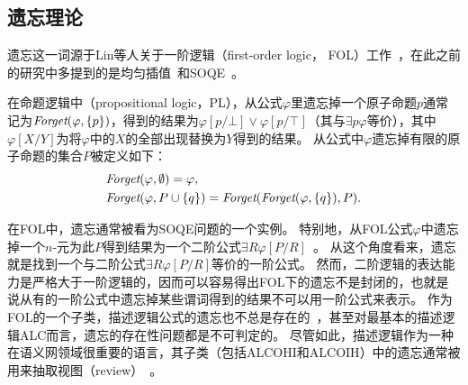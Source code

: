 \subsection{遗忘理论}
遗忘这一词源于Lin等人关于一阶逻辑（first-order logic， FOL）工作~\cite{lin1994forget}，在此之前的研究中多提到的是均匀插值~\cite{visser1996uniform,konev2009forgetting}和SOQE~\cite{ackermann1935untersuchungen}。

在命题逻辑中（propositional logic，PL），从公式$\varphi$里遗忘掉一个原子命题$p$通常记为$\textit{Forget}(\varphi,\{p\})$，得到的结果为$\varphi[p/\bot] \vee \varphi[p/\top]$（其与$\exists p\varphi$等价），其中$\varphi[X/Y]$为将$\varphi$中的$X$的全部出现替换为$Y$得到的结果。
从公式中$\varphi$遗忘掉有限的原子命题的集合$P$被定义如下：
\begin{alignat*}{2}
	&  \Forget(\varphi, \emptyset) = \varphi, \qquad \\ %
	&  \Forget(\varphi, P \cup \{q\})  = \Forget(\Forget(\varphi, \{q\}), P).
	\nonumber
\end{alignat*}

在FOL中，遗忘通常被看为SOQE问题的一个实例。
特别地，从FOL公式$\varphi$中遗忘掉一个$n$-元为此$P$得到结果为一个二阶公式$\exists R \varphi[P/R]$~\cite{lin1994forget}。
从这个角度看来，遗忘就是找到一个与二阶公式$\exists R \varphi[P/R]$等价的一阶公式。
然而，二阶逻辑的表达能力是严格大于一阶逻辑的，因而可以容易得出FOL下的遗忘不是封闭的，也就是说从有的一阶公式中遗忘掉某些谓词得到的结果不可以用一阶公式来表示。
作为FOL的一个子类，描述逻辑公式的遗忘也不总是存在的~\cite{DBLP:journals/ai/KonevL0W13}，甚至对最基本的描述逻辑{\cal ALC}而言，遗忘的存在性问题都是不可判定的。
尽管如此，描述逻辑作为一种在语义网领域很重要的语言，其子类（包括{\cal ALCOHI}和{\cal ALCOIH}）中的遗忘通常被用来抽取视图（review）~\cite{Wang:AMAI:2010,DBLP:conf/ijcai/LutzW11,Konev:JAIR:2012,DBLP:conf/ijcai/ZhaoS17,DBLP:conf/aaai/ZhaoSWZF20}。

